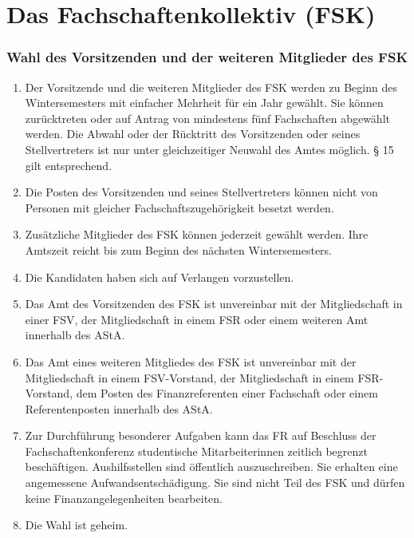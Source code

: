 \documentclass{article}
\begin{document}
\part{Das Fachschaftenkollektiv (FSK)}
\section{Wahl des Vorsitzenden und der weiteren Mitglieder des FSK}
\begin{enumerate}[(1)]
    \item Der Vorsitzende und die weiteren Mitglieder des FSK werden zu Beginn des Wintersemesters mit einfacher Mehrheit für ein Jahr gewählt. 
    	Sie können zurücktreten oder auf Antrag von mindestens fünf Fachschaften abgewählt werden. 
    	Die Abwahl oder der Rücktritt des Vorsitzenden oder seines Stellvertreters ist nur unter gleichzeitiger Neuwahl des Amtes möglich. 
    	§ 15 gilt entsprechend.
    \item Die Posten des Vorsitzenden und seines Stellvertreters können nicht von Personen mit gleicher Fachschaftszugehörigkeit besetzt werden.
    \item Zusätzliche Mitglieder des FSK können jederzeit gewählt werden. Ihre Amtszeit reicht bis zum Beginn des nächsten Wintersemesters.
    \item Die Kandidaten haben sich auf Verlangen vorzustellen.
    \item Das Amt des Vorsitzenden des FSK ist unvereinbar mit der Mitgliedschaft in einer FSV, der Mitgliedschaft in einem FSR oder einem weiteren Amt innerhalb des AStA.
    \item Das Amt eines weiteren Mitgliedes des FSK ist unvereinbar mit der Mitgliedschaft in einem FSV-Vorstand, der Mitgliedschaft in einem FSR-Vorstand, dem Posten des Finanzreferenten einer Fachschaft oder einem Referentenposten innerhalb des AStA.
    \item Zur Durchführung besonderer Aufgaben kann das FR auf Beschluss der Fachschaftenkonferenz studentische Mitarbeiterinnen zeitlich begrenzt beschäftigen. Aushilfsstellen sind öffentlich auszuschreiben. 
    	Sie erhalten eine angemessene Aufwandsentschädigung. 
    	Sie sind nicht Teil des FSK und dürfen keine Finanzangelegenheiten bearbeiten.
    \item Die Wahl ist geheim. 
\end{enumerate}
\end{document}
